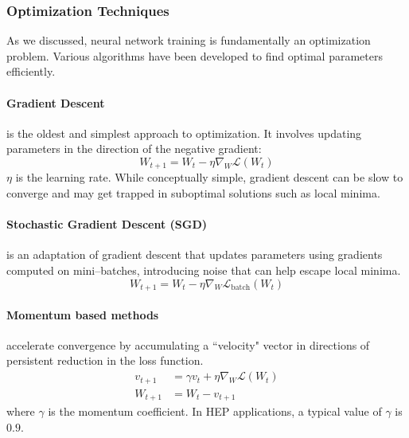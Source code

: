         \subsubsection{Optimization Techniques}
            As we discussed, neural network training is fundamentally an optimization problem.
            Various algorithms have been developed to find optimal parameters efficiently.
            
            \paragraph{Gradient Descent}is the oldest and simplest approach to optimization.
            It involves updating parameters in the direction of the negative gradient:
           \begin{equation}
                W_{t+1} = W_t - \eta \nabla_W \mathcal{L}(W_t)
           \end{equation}
            \(\eta\) is the learning rate.
            While conceptually simple, gradient descent can be slow to converge and may get trapped in suboptimal solutions such as local minima.
            
            \paragraph{Stochastic Gradient Descent (SGD)}is an adaptation of gradient descent that updates parameters using gradients computed on mini--batches, introducing noise that can help escape local minima.
            \begin{equation}
            W_{t+1} = W_t - \eta \nabla_W \mathcal{L}_{\text{batch}}(W_t)
            \end{equation}
            \paragraph{Momentum based methods}accelerate convergence by accumulating a ``velocity" vector in directions of persistent reduction in the loss function.
               \begin{align}
                   v_{t+1} &= \gamma v_t + \eta \nabla_W \mathcal{L}(W_t) \\
                   W_{t+1} &= W_t - v_{t+1}
               \end{align}
               where \(\gamma\) is the momentum coefficient.
               In HEP applications, a typical value of \(\gamma\) is \(0.9\).
            
